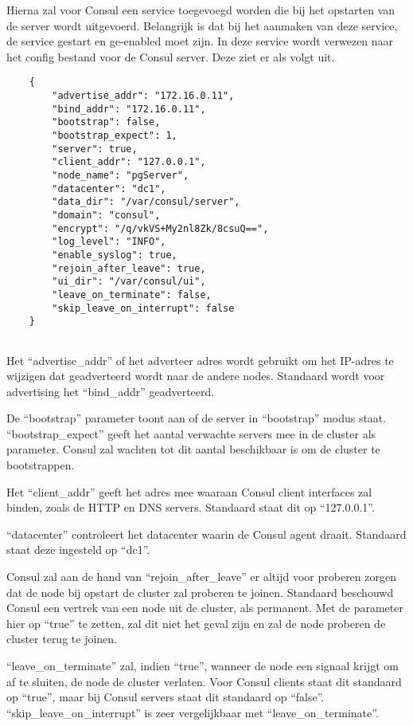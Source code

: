 Hierna zal voor Consul een service toegevoegd worden die bij het opstarten van de server wordt uitgevoerd. Belangrijk is dat bij het aanmaken van deze service, de service gestart en ge-enabled moet zijn. In deze service wordt verwezen naar het config bestand voor de Consul server. Deze ziet er als volgt uit.

\begin{lstlisting}
    {
        "advertise_addr": "172.16.0.11",
        "bind_addr": "172.16.0.11",
        "bootstrap": false,
        "bootstrap_expect": 1,
        "server": true,
        "client_addr": "127.0.0.1",
        "node_name": "pgServer",
        "datacenter": "dc1",
        "data_dir": "/var/consul/server",
        "domain": "consul",
        "encrypt": "/q/vkVS+My2nl8Zk/8csuQ==",
        "log_level": "INFO",
        "enable_syslog": true,
        "rejoin_after_leave": true,
        "ui_dir": "/var/consul/ui",
        "leave_on_terminate": false,
        "skip_leave_on_interrupt": false
    }
    
 \end{lstlisting}

Het “advertise\_addr” of het adverteer adres wordt gebruikt om het IP-adres te wijzigen dat geadverteerd wordt naar de andere nodes. Standaard wordt voor advertising het “bind\_addr” geadverteerd.

De “bootstrap” parameter toont aan of de server in “bootstrap” modus staat.
“bootstrap\_expect” geeft het aantal verwachte servers mee in de cluster als parameter. Consul zal wachten tot dit aantal beschikbaar is om de cluster te bootstrappen.

Het “client\_addr” geeft het adres mee waaraan Consul client interfaces zal binden, zoals de HTTP en DNS servers. Standaard staat dit op “127.0.0.1”.

“datacenter” controleert het datacenter waarin de Consul agent draait. Standaard staat deze ingesteld op “dc1”.

Consul zal aan de hand van “rejoin\_after\_leave” er altijd voor proberen zorgen dat de node bij opstart de cluster zal proberen te joinen. Standaard beschouwd Consul een vertrek van een node uit de cluster, als permanent. Met de parameter hier op “true” te zetten, zal dit niet het geval zijn en zal de node proberen de cluster terug te joinen.

“leave\_on\_terminate” zal, indien “true”, wanneer de node een signaal krijgt om af te sluiten, de node de cluster verlaten. Voor Consul clients staat dit standaard op “true”, maar bij Consul servers staat dit standaard op “false”. “skip\_leave\_on\_interrupt” is zeer vergelijkbaar met “leave\_on\_terminate”.

